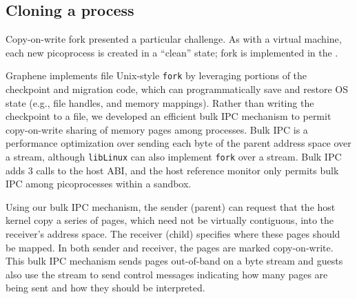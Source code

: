 \subsection{Cloning a process}


Copy-on-write fork presented a particular challenge.
As with a virtual machine, each new picoprocess 
is created in a ``clean'' state; fork is implemented in the \libos{}.

Graphene implements file Unix-style {\tt fork}
by leveraging portions of the checkpoint and migration code,
which can programmatically save and restore OS state (e.g., file handles, and memory mappings).
Rather than writing the checkpoint to a file, 
we developed an efficient bulk IPC mechanism to 
permit copy-on-write sharing of memory pages among processes.
Bulk IPC is a performance optimization over sending each byte of the parent address
space over a stream, although {\tt libLinux} can also implement {\tt fork}
over a stream.
Bulk IPC adds 3 calls to the host ABI,
and the host reference monitor only permits bulk IPC among
picoprocesses within a sandbox.



Using our bulk IPC mechanism,
the sender (parent) can request that the host kernel copy
a series of pages, which need not be virtually contiguous,
into the receiver's address space.
The receiver (child) specifies where these pages should be mapped.
In both sender and receiver, the pages are marked copy-on-write.  
This bulk IPC mechanism sends pages out-of-band on a byte stream and guests also use the stream to send control messages 
indicating 
how many pages are being sent and how they should be interpreted.

